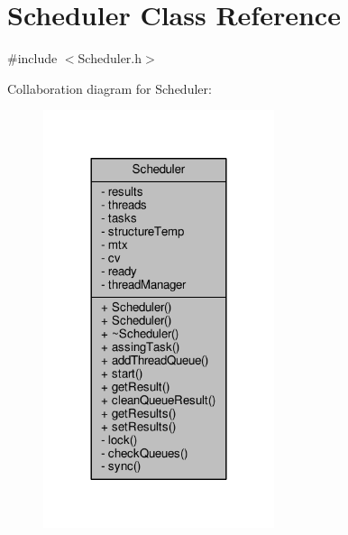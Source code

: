 \hypertarget{classScheduler}{}\section{Scheduler Class Reference}
\label{classScheduler}


{\ttfamily \#include $<$Scheduler.\+h$>$}



Collaboration diagram for Scheduler\+:
\nopagebreak
\begin{figure}[H]
\begin{center}
\leavevmode
\includegraphics[width=192pt]{classScheduler__coll__graph}
\end{center}
\end{figure}
